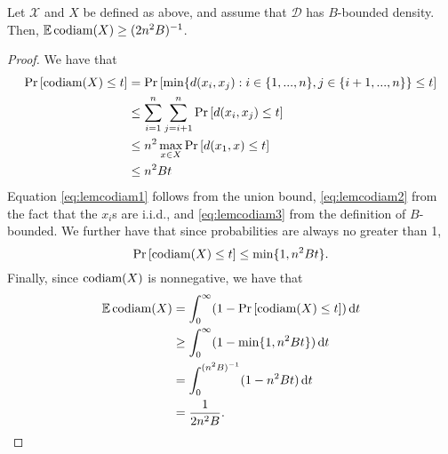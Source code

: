 \documentclass[thesis.tex]{subfiles}
\newcommand{\set}[1]{\mathcal {#1}}
\newcommand{\distribution}[1]{\mathcal {#1}}
\newcommand{\dist}[2]{\distf({#1},{#2})}
\newcommand{\distf}{d}
\newcommand{\codiam}[1]{\textnormal{codiam}({#1})}
\begin{document}
\begin{lemma}
    \label{lemma:Ecodiam}
    Let $\set X$ and $X$ be defined as above,
    and assume that $\distribution D$ has $B$-bounded density.
    Then, $\E\codiam{X} \ge (2n^2B)^{-1}$.
\end{lemma}
\begin{proof}
    We have that
    \begin{align}
        \prob{\codiam{X} \le t}
        &=
        \prob{\min \{ \dist{x_i}{x_j} : i\in\{1,...,n\}, j\in\{i+1,...,n\} \} \le t}
        \\ &\le 
        \sum_{i=1}^n\sum_{j=i+1}^n \prob{\dist{x_i}{x_j} \le t}
        \label{eq:lemcodiam1}
        \\ & \le
        n^2 \max_{x\in X} \prob{\dist{x_1}{x} \le t}
        \label{eq:lemcodiam2}
        \\ & \le 
        n^2 B t
        \label{eq:lemcodiam3}
    \end{align}
    Equation \eqref{eq:lemcodiam1} follows from the union bound,
    \eqref{eq:lemcodiam2} from the fact that the $x_i$s are i.i.d.,
    and \eqref{eq:lemcodiam3} from the definition of $B$-bounded.
    We further have that since probabilities are always no greater than 1,
    \begin{equation}
        \prob{\codiam{X}\le t} \le \min\{1,n^2Bt\}
        .
    \end{equation}
    Finally, since $\codiam{X}$ is nonnegative, we have that 
    \begin{align}
        \E \codiam{X}
        &=
        \int_0^\infty (1-\prob{\codiam{X} \le t}) \dd t
        \\ & \ge
        \int_0^\infty (1-\min\{1,n^2 Bt\}) \dd t
        \\ & = 
        \int_0^{(n^2B)^{-1}} (1 - n^2 Bt) \dd t
        \\ & =
        \frac{1}{2n^2B}
        \label{eq:Ecodiamproof}
        .
    \end{align}
\end{proof}

\end{document}
